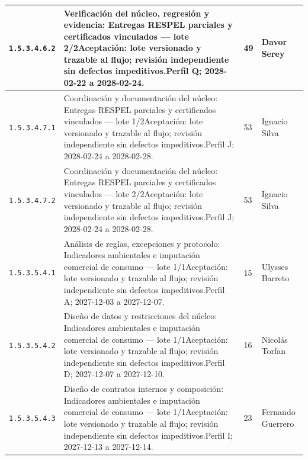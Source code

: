 \begin{longtable}{L{29mm}L{80mm}R{12mm}L{28mm}}
\texttt{1.\allowbreak{}5.\allowbreak{}3.\allowbreak{}4.\allowbreak{}6.\allowbreak{}2} & Verificación del núcleo, regresión y evidencia: Entregas RESPEL parciales y certificados vinculados — lote 2/2\newline Aceptación: lote versionado y trazable al flujo; revisión independiente sin defectos impeditivos.\newline Perfil Q; 2028-02-22 a 2028-02-24. & 49 & Davor Serey\\\hline
\texttt{1.\allowbreak{}5.\allowbreak{}3.\allowbreak{}4.\allowbreak{}7.\allowbreak{}1} & Coordinación y documentación del núcleo: Entregas RESPEL parciales y certificados vinculados — lote 1/2\newline Aceptación: lote versionado y trazable al flujo; revisión independiente sin defectos impeditivos.\newline Perfil J; 2028-02-24 a 2028-02-28. & 53 & Ignacio Silva\\\hline
\texttt{1.\allowbreak{}5.\allowbreak{}3.\allowbreak{}4.\allowbreak{}7.\allowbreak{}2} & Coordinación y documentación del núcleo: Entregas RESPEL parciales y certificados vinculados — lote 2/2\newline Aceptación: lote versionado y trazable al flujo; revisión independiente sin defectos impeditivos.\newline Perfil J; 2028-02-24 a 2028-02-28. & 53 & Ignacio Silva\\\hline
\texttt{1.\allowbreak{}5.\allowbreak{}3.\allowbreak{}5.\allowbreak{}4.\allowbreak{}1} & Análisis de reglas, excepciones y protocolo: Indicadores ambientales e imputación comercial de consumo — lote 1/1\newline Aceptación: lote versionado y trazable al flujo; revisión independiente sin defectos impeditivos.\newline Perfil A; 2027-12-03 a 2027-12-07. & 15 & Ulysses Barreto\\\hline
\texttt{1.\allowbreak{}5.\allowbreak{}3.\allowbreak{}5.\allowbreak{}4.\allowbreak{}2} & Diseño de datos y restricciones del núcleo: Indicadores ambientales e imputación comercial de consumo — lote 1/1\newline Aceptación: lote versionado y trazable al flujo; revisión independiente sin defectos impeditivos.\newline Perfil D; 2027-12-07 a 2027-12-10. & 16 & Nicolás Torfan\\\hline
\texttt{1.\allowbreak{}5.\allowbreak{}3.\allowbreak{}5.\allowbreak{}4.\allowbreak{}3} & Diseño de contratos internos y composición: Indicadores ambientales e imputación comercial de consumo — lote 1/1\newline Aceptación: lote versionado y trazable al flujo; revisión independiente sin defectos impeditivos.\newline Perfil I; 2027-12-13 a 2027-12-14. & 23 & Fernando Guerrero\\\hline

\end{longtable}
